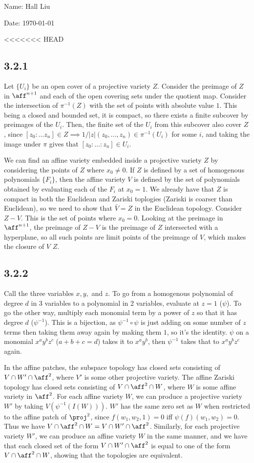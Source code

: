 \documentclass{article}
\begin{document}
Name: Hall Liu

Date: \today 
\vspace{1.5cm}

<<<<<<< HEAD
\subsection*{3.2.1}
Let $\{U_i\}$ be an open cover of a projective variety $Z$. Consider the preimage of $Z$ in $\aff^{n+1}$ and each of the open covering sets under the quotient map. Consider the intersection of $\pi^{-1}(Z)$ with the set of points with absolute value $1$. This being a closed and bounded set, it is compact, so there exists a finite subcover by preimages of the $U_i$. Then, the finite set of the $U_i$ from this subcover also cover $Z$, since $[z_0:\ldots z_n]\in Z\implies 1/|z|(z_0,\ldots,z_n)\in\pi^{-1}(U_i)$ for some $i$, and taking the image under $\pi$ gives that $[z_0:\ldots:z_n]\in U_i$.

We can find an affine variety embedded inside a projective variety $Z$ by considering the points of $Z$ where $x_0\neq0$. If $Z$ is defined by a set of homogenous polynomials $\{F_i\}$, then the affine variety $V$ is defined by the set of polynomials obtained by evaluating each of the $F_i$ at $x_0=1$. We already have that $Z$ is compact in both the Euclidean and Zariski toplogies (Zariski is coarser than Euclidean), so we need to show that $\bar{V}=Z$ in the Euclidean topology. Consider $Z-V$. This is the set of points where $x_0=0$. Looking at the preimage in $\aff^{n+1}$, the preimage of $Z-V$ is the preimage of $Z$ intersected with a hyperplane, so all such points are limit points of the preimage of $V$, which makes the closure of $V$ $Z$.
\subsection*{3.2.2}
Call the three variables $x,y,$ and $z$. To go from a homogenous polynomial of degree $d$ in 3 variables to a polynomial in 2 variables, evaluate at $z=1$ ($\psi$). To go the other way, multiply each monomial term by a power of $z$ so that it has degree $d$ ($\psi^{-1}$). This is a bijection, as $\psi^{-1}\circ\psi$ is just adding on some number of $z$ terms then taking them away again by making them $1$, so it's the identity. $\psi$ on a monomial $x^ay^bz^c$ ($a+b+c=d$) takes it to $x^ay^b$, then $\psi^{-1}$ takes that to $x^ay^bz^c$ again. 

In the affine patches, the subspace topology has closed sets consisting of $V\cap W'\cap\aff^2$, where $V'$ is some other projective variety. The affine Zariski topology has closed sets consisting of $V\cap\aff^2\cap W$, where $W$ is some affine variety in $\aff^2$. For each affine variety $W$, we can produce a projective variety $W'$ by taking $V(\psi^{-1}(I(W)))$. $W'$ has the same zero set as $W$ when restricted to the affine patch of $\proj^2$, since $f(w_1,w_2,1)=0$ iff $\psi(f)(w_1,w_2)=0$. Thus we have $V\cap\aff^2\cap W=V\cap W'\cap\aff^2$. Similarly, for each projective variety $W'$, we can produce an affine variety $W$ in the same manner, and we have that each closed set of the form $V\cap W'\cap\aff^2$ is equal to one of the form $V\cap\aff^2\cap W$, showing that the topologies are equivalent.
\end{document}
